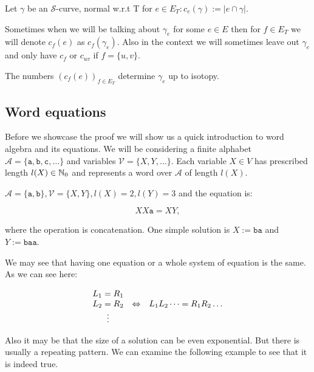 \begin{defn}
	Let $\gamma$ be an $\mathcal{S}$-curve, normal w.r.t T for $e \in E_T: c_e(\gamma) := |e \cap \gamma|$.
\end{defn}

Sometimes when we will be talking about $\gamma_e$ for some $e \in E$ then for $f \in E_T$ we will denote $c_f(e)$ as $c_f(\gamma_e)$. Also in the context we will sometimes leave out $\gamma_e$ and only have $c_f$ or $c_{uv}$ if $f = \{u,v\}$. 

\begin{claim}
	The numbers $\left( c_f(e)\right)_{f \in E_T}$ determine $\gamma_e$ up to isotopy.
	\label{string-claim}
\end{claim}

\subsection{Word equations}

Before we showcase the proof we will show us a quick introduction to word algebra and its equations. We will be considering a finite alphabet $\mathcal{A} = \{\mathtt{a}, \mathtt{b}, \mathtt{c}, \dots\}$ and variables $\mathcal{V} = \{X,Y, \dots\}$. Each variable $X \in V$ has prescribed length $l(X) \in \mathbb{N}_0$ and represents a word over $\mathcal{A}$ of length $l(X)$.

\begin{example}
	$\mathcal{A} = \{\mathtt{a}, \mathtt{b}\}, \mathcal{V} = \{X,Y\}, l(X) = 2, l(Y) = 3$ and the equation is:
	
	$$
	XX\mathtt{a} = XY,
	$$
	
	\noindent where the operation is concatenation. One simple solution is $X := \mathtt{ba}$ and $Y := \mathtt{baa}$.
\end{example}

We may see that having one equation or a whole system of equation is the same. As we can see here:

$$
\begin{array}{c c c}
	L_1 = R_1 & & \\
	L_2 = R_2 & \Leftrightarrow & L_1L_2 \dots = R_1 R_2 \dots \\
	\vdots & &
\end{array}
$$

Also it may be that the size of a solution can be even exponential. But there is usually a repeating pattern. We can examine the following example to see that it is indeed true.


